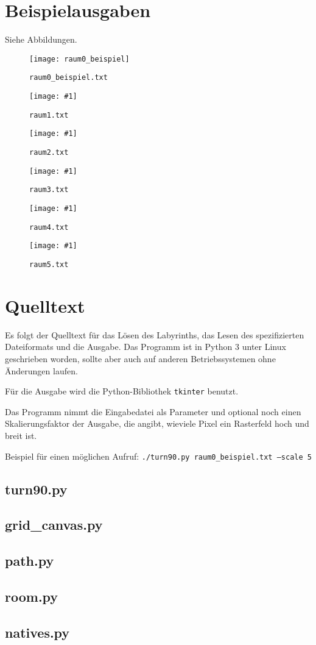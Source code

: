 \documentclass{scrartcl}
\newcommand{\src}[1]{\texttt{#1}}
\begin{document}
\section{Beispielausgaben}
Siehe Abbildungen.

\newcommand{\RoomFigure}[1]{%
\begin{figure} %
	\center\texttt{[image: \#1]} %
	\caption{\src{#1.txt}} %
\end{figure} %
}

\begin{figure}
	\center\texttt{[image: raum0\_beispiel]}
	\caption{\src{raum0\_beispiel.txt}}
\end{figure}

\RoomFigure{raum1}
\RoomFigure{raum2}
\RoomFigure{raum3}
\RoomFigure{raum4}
\RoomFigure{raum5}

\newpage\appendix
\section{Quelltext}
Es folgt der Quelltext für das Lösen des Labyrinths, das Lesen des
spezifizierten Dateiformats und die Ausgabe. Das Programm ist in Python 3 unter
Linux geschrieben worden, sollte aber auch auf anderen Betriebssystemen ohne
Änderungen laufen.

Für die Ausgabe wird die Python-Bibliothek \src{tkinter} benutzt.

Das Programm nimmt die Eingabedatei als Parameter und optional noch einen
Skalierungsfaktor der Ausgabe, die angibt, wieviele Pixel ein Rasterfeld hoch
und breit ist.

Beispiel für einen möglichen Aufruf: \src{./turn90.py raum0\_beispiel.txt %
--scale 5}

\newcommand{\InputSource}[1]{\subsection*{#1.py}}

\InputSource{turn90}
\subsection*{grid\_canvas.py}
\InputSource{path}
\InputSource{room}
\InputSource{natives}
\end{document}
